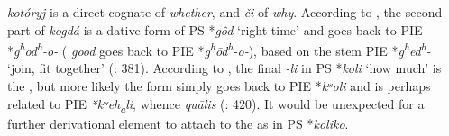  \textit{kotóryj} is a direct cognate of  \textit{whether}, and \textit{či} of \textit{why}. According to \cite[172, 227]{Derksen2008}, the second part of  \textit{kogdá} is a dative form of PS *\textit{gôd} ‘right time’ and goes back to PIE *\textit{g\textsuperscript{h}}\textit{od\textsuperscript{h}}\textit{-o-} ( \textit{good} goes back to PIE *\textit{g\textsuperscript{h}}\textit{\=od}\textit{\textsuperscript{h}}\textit{-o-}), based on the stem PIE *\textit{g\textsuperscript{h}}\textit{ed\textsuperscript{h}}\textit{-} ‘join, fit together’ (\citealt{MalloryAdams2006}: 381). According to \citet{Derksen2008}, the final \textit{-li} in PS *\textit{koli} ‘how much’ is the  , but more likely the form simply goes back to PIE *\textit{kʷ}\textit{oli} and is perhaps related to PIE \textit{*kʷ}\textit{eh\textsubscript{a}}\textit{li}, whence  \textit{qu\=alis} (\citealt{MalloryAdams2006}: 420). It would be unexpected for a further derivational element to attach to the  as in PS *\textit{koliko}.

